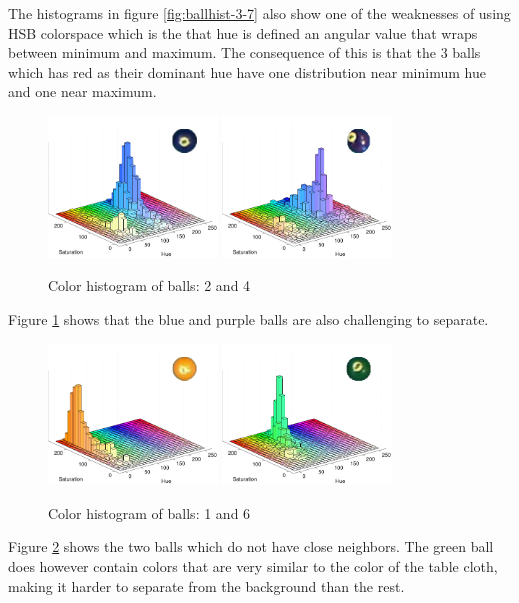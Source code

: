 The histograms in figure \ref{fig:ballhist-3-7} also show one of the weaknesses of using HSB colorspace which is the that hue is defined an angular value that wraps between minimum and maximum. The consequence of this is that the 3 balls which has red as their dominant hue have one distribution near minimum hue and one near maximum.
\begin{figure}[H]
\centering
\subfloat
{
	\includegraphics[width=0.4\textwidth]{images/ballhist/2}
}
\subfloat
{
	\includegraphics[width=0.4\textwidth]{images/ballhist/4}
}
\caption{Color histogram of balls: 2 and 4}
\label{fig:ballhist-2-4}
\end{figure}
Figure \ref{fig:ballhist-2-4} shows that the blue and purple balls are also challenging to separate.

\begin{figure}[H]
\centering
\subfloat
{
	\includegraphics[width=0.4\textwidth]{images/ballhist/1}
}
\subfloat
{
	\includegraphics[width=0.4\textwidth]{images/ballhist/6}
}
\caption{Color histogram of balls: 1 and 6}
\label{fig:ballhist-1-6}
\end{figure} 
Figure \ref{fig:ballhist-1-6} shows the two balls which do not have close neighbors. The green ball does however contain colors that are very similar to the color of the table cloth, making it harder to separate from the background than the rest.\\

